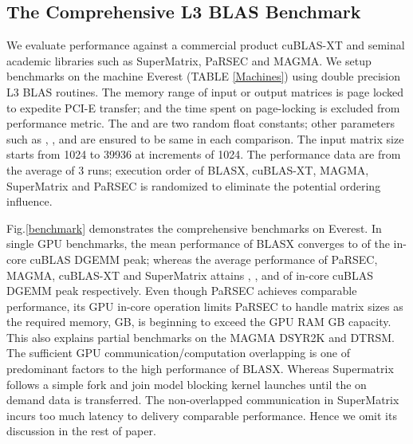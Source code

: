 \documentclass[conference]{IEEEtran}
\begin{document}
\vspace{-0.12in}
\subsection{The Comprehensive L3 BLAS Benchmark}
\vspace{-0.05in}

We evaluate performance against a commercial product cuBLAS-XT and seminal 
academic libraries such as SuperMatrix, PaRSEC and MAGMA.
We setup benchmarks on the machine Everest (TABLE \ref{Machines}) using double precision L3 BLAS 
routines. The memory range of input or output matrices is page locked to expedite PCI-E transfer; 
and the time spent on page-locking is excluded from performance metric. The  and  
are two random float constants; other parameters such as , ,  and  
are ensured to be same in each comparison. The input matrix size  starts from 1024 to 39936 at 
increments of 1024. The performance data are from the average of 3 runs; execution order of 
BLASX, cuBLAS-XT, MAGMA, SuperMatrix and PaRSEC is randomized to eliminate the potential ordering 
influence.

Fig.\ref{benchmark} demonstrates the comprehensive benchmarks on Everest. 
In single GPU benchmarks, the mean performance of BLASX converges to  of 
the in-core cuBLAS DGEMM peak; whereas the average performance of PaRSEC, MAGMA, cuBLAS-XT 
and SuperMatrix attains ,  ,  and  of in-core cuBLAS DGEMM 
peak respectively. Even though PaRSEC achieves comparable performance, its GPU in-core 
operation limits PaRSEC to handle matrix sizes  as the required memory, 
 GB, is beginning to exceed the GPU RAM  GB capacity. This also 
explains partial benchmarks on the MAGMA DSYR2K and DTRSM. The sufficient GPU 
communication/computation overlapping is one of predominant factors to the high performance 
of BLASX. Whereas Supermatrix follows a simple fork and join model blocking kernel launches 
until the on demand data is transferred. The non-overlapped communication in SuperMatrix 
incurs too much latency to delivery comparable performance. Hence we omit its discussion 
in the rest of paper.
\end{document}
